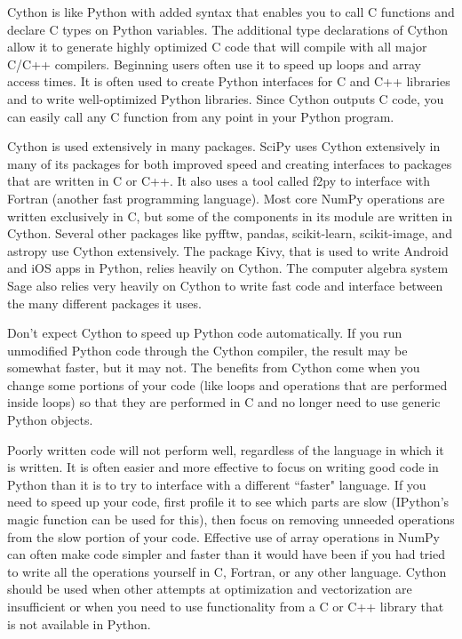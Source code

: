 Cython is like Python with added syntax that enables you to call C functions and declare C types on Python variables.
The additional type declarations of Cython allow it to generate highly optimized C code that will compile with all major C/C++ compilers.
Beginning users often use it to speed up loops and array access times.
It is often used to create Python interfaces for C and C++ libraries and to write well-optimized Python libraries.
Since Cython outputs C code, you can easily call any C function from any point in your Python program.

Cython is used extensively in many packages.
SciPy uses Cython extensively in many of its packages for both improved speed and creating interfaces to packages that are written in C or C++.
It also uses a tool called f2py to interface with Fortran (another fast programming language).
Most core NumPy operations are written exclusively in C, but some of the components in its  module are written in Cython.
Several other packages like pyfftw, pandas, scikit-learn, scikit-image, and astropy use Cython extensively.
The package Kivy, that is used to write Android and iOS apps in Python, relies heavily on Cython.
The computer algebra system Sage also relies very heavily on Cython to write fast code and interface between the many different packages it uses.

\begin{warn}
Don't expect Cython to speed up Python code automatically.
If you run unmodified Python code through the Cython compiler, the result may be somewhat faster, but it may not.
The benefits from Cython come when you change some portions of your code (like loops and operations that are performed inside loops) so that they are performed in C and no longer need to use generic Python objects.
\end{warn}

\begin{warn}
Poorly written code will not perform well, regardless of the language in which it is written.
It is often easier and more effective to focus on writing good code in Python than it is to try to interface with a different ``faster" language.
If you need to speed up your code, first profile it to see which parts are slow (IPython's magic function  can be used for this), then focus on removing unneeded operations from the slow portion of your code.
Effective use of array operations in NumPy can often make code simpler and faster than it would have been if you had tried to write all the operations yourself in C, Fortran, or any other language.
Cython should be used when other attempts at optimization and vectorization are insufficient or when you need to use functionality from a C or C++ library that is not available in Python.
\end{warn}

